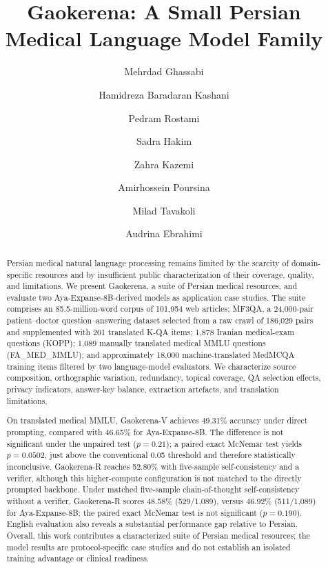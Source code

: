 \documentclass[manuscript,screen,review]{acmart}
\begin{document}
\title[Gaokerena]{Gaokerena: A Small Persian Medical Language Model Family}

\author{Mehrdad Ghassabi}
\author{Hamidreza Baradaran Kashani}
\author{Pedram Rostami}
\author{Sadra Hakim}
\author{Zahra Kazemi}
\author{Amirhossein Poursina}
\author{Milad Tavakoli}
\author{Audrina Ebrahimi}
\renewcommand{\shortauthors}{Ghassabi et al.}

\begin{abstract}
Persian medical natural language processing remains limited by the scarcity of domain-specific resources and by insufficient public characterization of their coverage, quality, and limitations. We present Gaokerena, a suite of Persian medical resources, and evaluate two Aya-Expanse-8B-derived models as application case studies. The suite comprises an 85.5-million-word corpus of 101,954 web articles; MF3QA, a 24,000-pair patient--doctor question--answering dataset selected from a raw crawl of 186,029 pairs and supplemented with 201 translated K-QA items; 1,878 Iranian medical-exam questions (KOPP); 1,089 manually translated medical MMLU questions (FA\_MED\_MMLU); and approximately 18,000 machine-translated MedMCQA training items filtered by two language-model evaluators. We characterize source composition, orthographic variation, redundancy, topical coverage, QA selection effects, privacy indicators, answer-key balance, extraction artefacts, and translation limitations.

On translated medical MMLU, Gaokerena-V achieves 49.31\% accuracy under direct prompting, compared with 46.65\% for Aya-Expanse-8B. The difference is not significant under the unpaired test ($p=0.21$); a paired exact McNemar test yields $p=0.0502$, just above the conventional 0.05 threshold and therefore statistically inconclusive. Gaokerena-R reaches 52.80\% with five-sample self-consistency and a verifier, although this higher-compute configuration is not matched to the directly prompted backbone. Under matched five-sample chain-of-thought self-consistency without a verifier, Gaokerena-R scores 48.58\% (529/1,089), versus 46.92\% (511/1,089) for Aya-Expanse-8B; the paired exact McNemar test is not significant ($p=0.190$). English evaluation also reveals a substantial performance gap relative to Persian. Overall, this work contributes a characterized suite of Persian medical resources; the model results are protocol-specific case studies and do not establish an isolated training advantage or clinical readiness.
\end{abstract}
\end{document}
